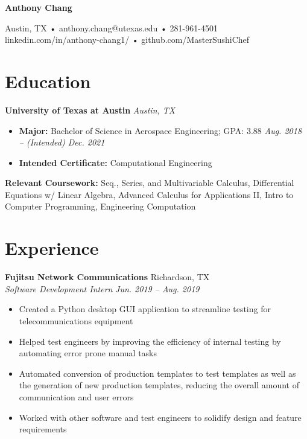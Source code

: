 \documentclass[letterpaper,11pt]{article}
\begin{document}
\begin{center}
\textbf{\LARGE{Anthony Chang}}

Austin, TX • anthony.chang@utexas.edu • 281-961-4501\\
linkedin.com/in/anthony-chang1/ • github.com/MasterSushiChef
\end{center}

{
\section{Education}
\textbf{University of Texas at Austin} \hfill \textit{Austin, TX}\\
\begin{itemize}[noitemsep, topsep=0pt, leftmargin=0.7cm]
  \item \textbf{\small{Major:}} Bachelor of Science in Aerospace Engineering; GPA: 3.88 \hfill \textit{Aug. 2018 -- (Intended) Dec. 2021}\\
  \item \textbf{\small{Intended Certificate:}} Computational Engineering\\
\end{itemize}
\textbf{\small{Relevant Coursework:}} Seq., Series, and Multivariable Calculus, Differential Equations w/ Linear Algebra,
Advanced Calculus for Applications II, Intro to Computer Programming, Engineering Computation
}

\section{Experience}
\textbf{Fujitsu Network Communications} \hfill Richardson, TX\\
\textit{Software Development Intern} \hfill \textit{Jun. 2019 -- Aug. 2019}\\
\begin{itemize}[noitemsep, topsep=0pt, leftmargin=0.7cm]
  \item Created a Python desktop GUI application to streamline testing for telecommunications equipment
  \item Helped test engineers by improving the efficiency of internal testing by automating error prone manual tasks
  \item Automated conversion of production templates to test templates as well as the generation of new production templates, reducing the overall amount of communication and user errors
  \item Worked with other software and test engineers to solidify design and feature requirements 
\end{itemize}
\end{document}
